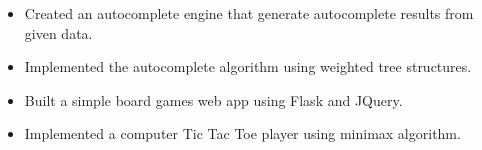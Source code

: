 \divider


\vspace{5pt}

\begin{itemize}
	\item Created an autocomplete engine that generate autocomplete results from given data.
	\item Implemented the autocomplete algorithm using weighted tree structures.
\end{itemize}

\divider


\vspace{5pt}

\begin{itemize}
	\item Built a simple board games web app using Flask and JQuery.
	\item Implemented a computer Tic Tac Toe player using minimax algorithm.
\end{itemize}

